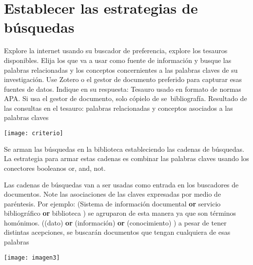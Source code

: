 \section{Establecer las estrategias de búsquedas}

 \begin{kaobox}[frametitle= Ejercicio ]
Explore la internet usando su buscador de preferencia, explore los tesauros disponibles. Elija los que va a usar como fuente de información y busque las palabras relacionadas y los conceptos concernientes a las palabras claves de su investigación. Use Zotero o el gestor de documento preferido para capturar esas fuentes de datos. Indique en su respuesta: Tesauro usado en formato de normas APA. Si usa el gestor de documento, solo cópielo de se bibliografía. Resultado de las consultas en el tesauro: palabras relacionadas y conceptos asociados a las palabras claves  	
 \end{kaobox}


\begin{marginfigure}[-2cm]
	\texttt{[image: criterio]}
\end{marginfigure}

Se arman las búsquedas en la biblioteca estableciendo las cadenas de búsquedas. La estrategia para armar estas cadenas es combinar las palabras claves usando los conectores booleanos or, and, not. 
  
Las cadenas de búsquedas van a ser usadas como entrada en los buscadores de documentos. Note las asociaciones de las claves expresadas por medio de paréntesis. 
Por ejemplo:
(Sistema de información documental \textbf{or} servicio bibliográfico \textbf{or} biblioteca )  se agruparon de esta manera ya que son términos homónimos.
((dato) \textbf{or} (información) \textbf{or} (conocimiento) )  a pesar de tener distintas acepciones,  se buscarán documentos que tengan cualquiera de esas palabras

\begin{marginfigure}[-2.2cm]
	\texttt{[image: imagen3]}
\end{marginfigure}

